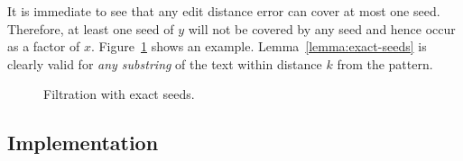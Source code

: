 It is immediate to see that any edit distance error can cover at most one seed.
Therefore, at least one seed of $y$ will not be covered by any seed and hence occur as a factor of $x$.
Figure~\ref{fig:seeds-ext} shows an example.
Lemma~\ref{lemma:exact-seeds} is clearly valid for \emph{any substring} of the text within distance $k$ from the pattern.

\begin{figure}[h]
\begin{center}
\caption{Filtration with exact seeds.}
\label{fig:seeds-ext}

\end{center}
\end{figure}

\subsection{Implementation}

